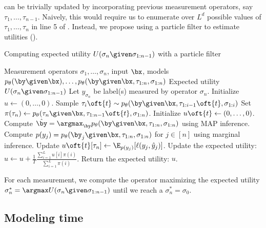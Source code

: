  can be trivially updated by incorporating previous measurement operators, say $\tau_1, \dots, \tau_{n-1}$.
Naively, this would require us to enumerate over $L^d$ possible values of $\tau_1, \dots, \tau_n$ in line 5 of .
Instead, we propose using a particle filter to estimate utilities ().

\begin{algorithm}
\renewcommand{\algorithmicrequire}{\textbf{Input:}}
\renewcommand{\algorithmicensure}{\textbf{Output:}}
\caption{Computing expected utility $U(\sigma_n \given \sigma_{1:n-1})$ with a particle filter}
  \label{algo:expected-utility}
  \begin{algorithmic}[1]
    \REQUIRE Measurement operators $\sigma_1, \dots, \sigma_n$, input $\bx$, models $p_\theta(\by \given \bx), \dots, p_\theta(\by \given \bx, \tau_{1:n}, \sigma_{1:n})$
    \ENSURE Expected utility $U(\sigma_n \given \sigma_{1:n-1})$
    \STATE Let $y_{\sigma_n}$ be label(s) measured by operator $\sigma_n$.
    \STATE Initialize $u \gets (0, \dots, 0)$.
      \STATE Sample $\tau_i\oft{t} \sim \p(\by \given \bx, \tau_{1:i-1}\oft{t}, \sigma_{1:i})$
      \ENDFOR
      \STATE Set $\pi(\tau_n) \gets \p(\tau_n \given \bx, \tau_{1:n-1}\oft{t}, \sigma_{1:n})$.
      \STATE Initialize $u\oft{t} \gets (0, \dots, 0)$.
      \STATE Compute $\byt = \argmax_{\by} p_\theta(\by \given \bx, \tau_{1:n}, \sigma_{1:n})$ using MAP inference.
      \STATE Compute $p(y_j) = p_\theta(\by_j \given \bx, \tau_{1:n}, \sigma_{1:n})$ for $j \in [n]$ using marginal inference.
      \STATE Update $u\oft{t}[\tau_n] \gets \E_{p(y_j)}[\ell(y_j, \yt_j)]$.
      \ENDFOR
      \STATE Update the expected utility: $u \gets u + \frac{1}{T} \frac{\sum_{i=1}^L u[i] \pi(i)}{\sum_{i=1}^L \pi(i)}$.
    \ENDFOR
    \STATE Return the expected utility: $u$.
  \end{algorithmic}
\end{algorithm}

For each measurement, we compute the operator maximizing the expected utility $\sigma_n^* = \argmax U(\sigma_n \given \sigma_{1:n-1})$ until we reach a $\sigma_n^* = \sigma_0$.

\subsection{Modeling time}
\label{sec:time}

